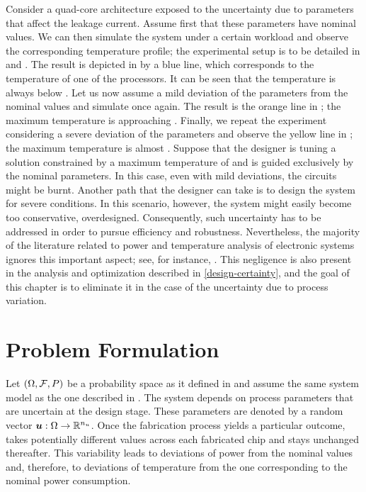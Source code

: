 Consider a quad-core architecture exposed to the uncertainty due to parameters
that affect the leakage current. Assume first that these parameters have nominal
values. We can then simulate the system under a certain workload and observe the
corresponding temperature profile; the experimental setup is to be detailed in
 and . The result is depicted in
 by a blue line, which corresponds to the temperature of one
of the processors. It can be seen that the temperature is always below
. Let us now assume a mild deviation of the parameters from the
nominal values and simulate once again. The result is the orange line in
; the maximum temperature is approaching .
Finally, we repeat the experiment considering a severe deviation of the
parameters and observe the yellow line in ; the maximum
temperature is almost . Suppose that the designer is tuning a
solution constrained by a maximum temperature of  and is guided
exclusively by the nominal parameters. In this case, even with mild deviations,
the circuits might be burnt. Another path that the designer can take is to
design the system for severe conditions. In this scenario, however, the system
might easily become too conservative, overdesigned. Consequently, such
uncertainty has to be addressed in order to pursue efficiency and robustness.
Nevertheless, the majority of the literature related to power and temperature
analysis of electronic systems ignores this important aspect; see, for instance,
\cite{rao2009, rai2011, thiele2011}. This negligence is also present in the
analysis and optimization described in \cref{design-certainty}, and the goal of
this chapter is to eliminate it in the case of the uncertainty due to process
variation.

\section{Problem Formulation}

Let $(\Omega, \mathcal{F}, \probability)$ be a probability space as it defined
in  and assume the same system model as the one
described in . The system depends on \nu process parameters
that are uncertain at the design stage. These parameters are denoted by a random
vector $\boldsymbol{u}: \Omega \to \mathbb{R}^{n_{u}}$. Once the fabrication process yields a
particular outcome, \vu takes potentially different values across each
fabricated chip and stays unchanged thereafter. This variability leads to
deviations of power from the nominal values and, therefore, to deviations of
temperature from the one corresponding to the nominal power consumption.

